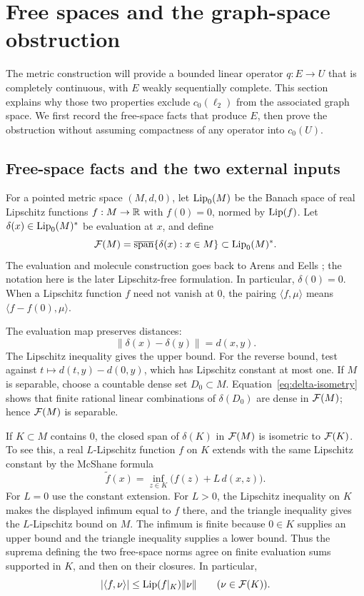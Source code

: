 \section{Free spaces and the graph-space obstruction}
\label{sec:free-graph}

The metric construction will provide a bounded linear operator
\(q:E\to U\) that is completely continuous, with \(E\) weakly
sequentially complete. This section explains why those two properties
exclude \(c_0(\ell_2)\) from the associated graph space. We first
record the free-space facts that produce \(E\), then prove the
obstruction without assuming compactness of any operator into
\(c_0(U)\).

\subsection{Free-space facts and the two external inputs}

For a pointed metric space \((M,d,0)\), let \(\operatorname{Lip}_0(M)\) be the
Banach space of real Lipschitz functions \(f:M\to\mathbb R\) with \(f(0)=0\),
normed by \(\operatorname{Lip}(f)\). Let \(\delta(x)\in\operatorname{Lip}_0(M)^*\) be evaluation
at \(x\), and define
\[
 \mathcal F(M)=\overline{\operatorname{span}}\{\delta(x):x\in M\}
       \subset\operatorname{Lip}_0(M)^*.
\]
The evaluation and molecule construction goes back to Arens and Eells
\cite[Sections~2--3]{AE56}; the notation here is the later
Lipschitz-free formulation. In particular, \(\delta(0)=0\).
When a Lipschitz function \(f\) need not vanish at \(0\), the pairing
\(\langle f,\mu\rangle\) means \(\langle f-f(0),\mu\rangle\).

The evaluation map preserves distances:
\begin{equation}
\label{eq:delta-isometry}
 \|\delta(x)-\delta(y)\|=d(x,y).
\end{equation}
The Lipschitz inequality gives the upper bound. For the reverse bound,
test against \(t\mapsto d(t,y)-d(0,y)\), which has Lipschitz constant
at most one. If \(M\) is separable, choose a countable dense set
\(D_0\subset M\). Equation~\eqref{eq:delta-isometry} shows that finite
rational linear combinations of \(\delta(D_0)\) are dense in
\(\mathcal F(M)\); hence \(\mathcal F(M)\) is separable.

If \(K\subset M\) contains \(0\), the closed span of \(\delta(K)\)
in \(\mathcal F(M)\) is isometric to \(\mathcal F(K)\). To see this, a real
\(L\)-Lipschitz function \(f\) on \(K\) extends with the same
Lipschitz constant by the McShane formula
\cite[Lemma~3.1 and the following paragraph]{Kalton04}
\[
 \widetilde f(x)=\inf_{z\in K}\bigl(f(z)+L\,d(x,z)\bigr).
\]
For \(L=0\) use the constant extension. For \(L>0\), the Lipschitz
inequality on \(K\) makes the displayed infimum equal to \(f\) there,
and the triangle inequality gives the \(L\)-Lipschitz bound on \(M\).
The infimum is finite because \(0\in K\) supplies an upper bound and
the triangle inequality supplies a lower bound. Thus the suprema
defining the two free-space norms agree on finite evaluation sums
supported in \(K\), and then on their closures. In particular,
\begin{equation}
\label{eq:compact-pairing}
 |\langle f,\nu\rangle|
 \le \operatorname{Lip}(f|_K)\|\nu\| \qquad(\nu\in\mathcal F(K)).
\end{equation}

